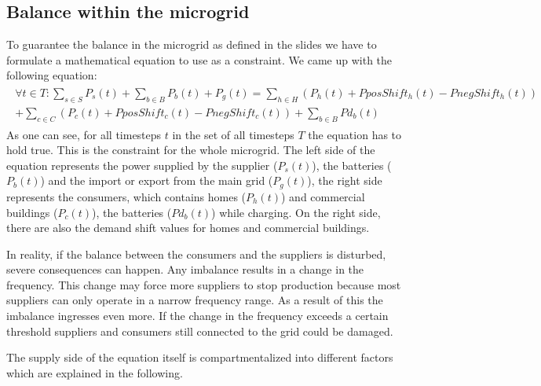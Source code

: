 \subsection{Balance within the microgrid}
To guarantee the balance in the microgrid as defined in the slides we have to formulate a mathematical equation to use as a constraint.
We came up with the following equation:\\
\begin{align} \label{eq1:balance}
\begin{split}
\forall t \in T: \sum\limits_{s \in S}{P_{s}(t)} + \sum\limits_{b \in B}{P_{b}(t)} + P_{g}(t) = \sum_{h \in H}({P_{h}(t)} + PposShift_h(t) - PnegShift_h(t))
\\ + \sum_{c \in C}({P_{c}(t)} + PposShift_c(t) - PnegShift_c(t)) + \sum\limits_{b \in B}{Pd_{b}(t)}
\end{split}
\end{align}
As one can see, for all timesteps $t$ in the set of all timesteps $T$ the equation has to hold true. 
This is the constraint for the whole microgrid. 
The left side of the equation represents the power supplied by the supplier ($P_{s}(t)$), the batteries ($P_{b}(t)$) and the import or export from the main grid ($P_{g}(t)$), the right side represents the consumers, which contains homes ($P_{h}(t)$) and commercial buildings ($P_{c}(t)$), the batteries ($Pd_{b}(t)$) while charging. 
On the right side, there are also the demand shift values for homes and commercial buildings.

In reality, if the balance between the consumers and the suppliers is disturbed, severe consequences can happen. 
Any imbalance results in a change in the frequency. 
This change may force more suppliers to stop production because most suppliers can only operate in a narrow frequency range. 
As a result of this the imbalance ingresses even more. 
If the change in the frequency exceeds a certain threshold suppliers and consumers still connected to the grid could be damaged. 

The supply side of the equation itself is compartmentalized into different factors which are explained in the following.

